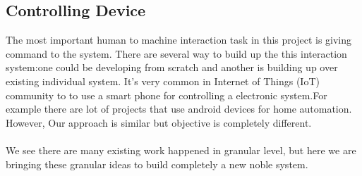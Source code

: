 \documentclass{sigchi}
\begin{document}
\subsection{Controlling Device}
The most important human to machine interaction task in this project is giving command to the system. There are several way to build up the this interaction system:one could be developing from scratch and another is building up over existing individual system. It's very common in Internet of Things (IoT) community to to use a smart phone for controlling a electronic system.For example there are lot of projects that use android devices for home automation. However, Our approach is similar but objective is completely different.
\\
\\
We see there are many existing work happened in granular level, but here we are bringing these granular ideas to build completely a new noble system.
\end{document}
